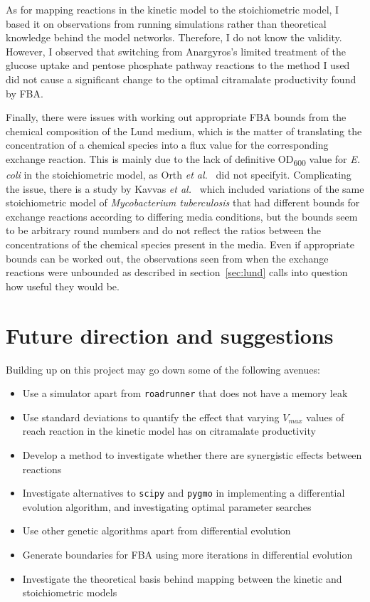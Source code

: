 \documentclass[parskip=full]{scrreprt}
\begin{document}
As for mapping reactions in the kinetic model to the stoichiometric model, I based it on observations from running simulations rather than theoretical knowledge behind the model networks. Therefore, I do not know the validity. However, I observed that switching from Anargyros's limited treatment of the glucose uptake and pentose phosphate pathway reactions to the method I used did not cause a significant change to the optimal citramalate productivity found by FBA.

Finally, there were issues with working out appropriate FBA bounds from the chemical composition of the Lund medium, which is the matter of translating the concentration of a chemical species into a flux value for the corresponding exchange reaction. This is mainly due to the lack of definitive OD\textsubscript{600} value for \emph{E. coli} in the stoichiometric model, as Orth \emph{et al.}~\cite{orth_comprehensive_2011} did not specifyit. Complicating the issue, there is a study by Kavvas \emph{et al.}~\cite{kavvas_updated_2018} which included variations of the same stoichiometric model of \emph{Mycobacterium tuberculosis} that had different bounds for exchange reactions according to differing media conditions, but the bounds seem to be arbitrary round numbers and do not reflect the ratios between the concentrations of the chemical species present in the media. Even if appropriate bounds can be worked out, the observations seen from when the exchange reactions were unbounded as described in section~\ref{sec:lund} calls into question how useful they would be.

\section{Future direction and suggestions}
\label{sec:future}

Building up on this project may go down some of the following avenues:

\begin{itemize}
\item Use a simulator apart from \texttt{roadrunner} that does not have a memory leak
\item Use standard deviations to quantify the effect that varying $V_{max}$ values of reach reaction in the kinetic model has on citramalate productivity
\item Develop a method to investigate whether there are synergistic effects between reactions
\item Investigate alternatives to \texttt{scipy} and \texttt{pygmo} in implementing a differential evolution algorithm, and investigating optimal parameter searches
\item Use other genetic algorithms apart from differential evolution
\item Generate boundaries for FBA using more iterations in differential evolution
\item Investigate the theoretical basis behind mapping between the kinetic and stoichiometric models
\end{itemize}
  
\end{document}
